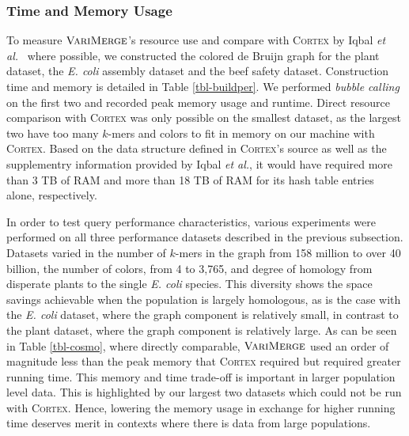 \subsubsection{Time and Memory Usage}

To measure $\mbox{\rm {\sc VariMerge}}$'s resource use and compare with \textsc{Cortex} by Iqbal {\it et al.}~\cite{ICTFM12} where possible, we constructed the colored de Bruijn graph for the plant dataset, the \emph{E. coli} assembly dataset and the beef safety dataset. Construction time and memory is detailed in Table \ref{tbl-buildper}. We performed \emph{bubble calling} on the first two and recorded peak memory usage and runtime.  Direct resource comparison with \textsc{Cortex} was only possible on the smallest  dataset, as the largest two have too many $k$-mers and colors to fit in memory on our machine with \textsc{Cortex}.  Based on the data structure defined in \textsc{Cortex}'s source as well as the supplementry information provided by Iqbal \emph{et al.}, it would have required more than 3 TB of RAM and more than 18 TB of RAM for its hash table entries alone, respectively.



















In order to test query performance characteristics, various experiments were performed on all three performance datasets described in the previous subsection.  Datasets varied in the number of $k$-mers in the graph from 158 million to over 40 billion, the number of colors, from 4 to 3,765, and degree of homology from disperate plants to the single \emph{E. coli} species.  This diversity shows the space savings achievable when the population is largely homologous, as is the case with the \emph{E. coli} dataset, where the graph component is relatively small, in contrast to the plant dataset, where the graph component is relatively large. As can be seen in Table \ref{tbl-cosmo}, where directly comparable, $\mbox{\rm {\sc VariMerge}}$ used an order of magnitude less than the peak memory that \textsc{Cortex}  required but required greater running time.  This memory and time trade-off is important in larger population level data.  This is highlighted by our largest two datasets which could not be run with \textsc{Cortex}.
Hence, lowering the memory usage in exchange for higher running time deserves merit in contexts where there is data from large populations.

